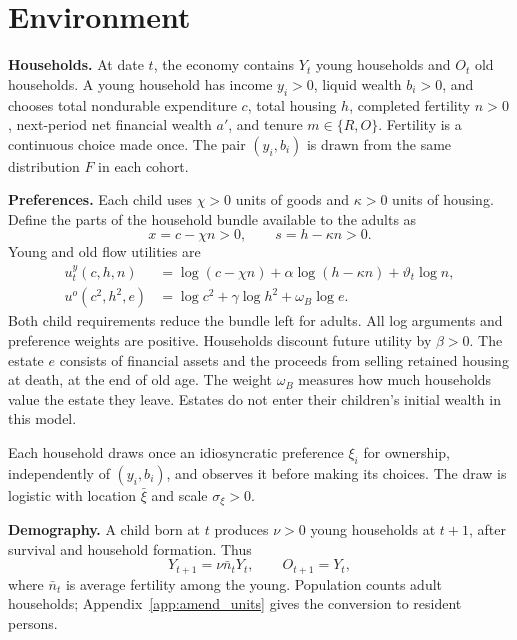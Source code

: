 \section{Environment}

\textbf{Households.}
At date $t$, the economy contains $Y_t$ young households and $O_t$ old
households. A young household has income $y_i>0$, liquid wealth $b_i>0$, and
chooses total nondurable expenditure $c$, total housing $h$, completed
fertility $n>0$, next-period net financial wealth $a'$, and tenure $m\in\{R,O\}$. Fertility is a
continuous choice made once. The pair $(y_i,b_i)$ is drawn from the same
distribution $F$ in each cohort.

\textbf{Preferences.}
Each child uses $\chi>0$ units of goods and $\kappa>0$ units of housing. Define
the parts of the household bundle available to the adults as
\begin{equation}
 x=c-\chi n>0,\qquad s=h-\kappa n>0.
 \label{eq:amend_usable_bundles}
\end{equation}
Young and old flow utilities are
\begin{align}
 u_t^y(c,h,n)&=\log(c-\chi n)+\alpha\log(h-\kappa n)
 +\vartheta_t\log n,
 \label{eq:amend_preferences}\\
 u^o(c^2,h^2,e)&=\log c^2+\gamma\log h^2+\omega_B\log e.
 \label{eq:amend_old_preferences}
\end{align}
Both child requirements reduce the bundle left for adults. All log arguments
and preference weights are positive. Households discount future utility by $\beta>0$.
The estate $e$ consists of financial assets and the proceeds from selling
retained housing at death, at the end of old age. The weight $\omega_B$
measures how much households value the estate they leave. Estates do not
enter their children's initial wealth in this model.

Each household draws once an idiosyncratic preference $\xi_i$ for ownership,
independently of $(y_i,b_i)$, and observes it before making its choices.
The draw is logistic with location $\bar\xi$ and scale $\sigma_\xi>0$.

\textbf{Demography.}
A child born at $t$ produces $\nu>0$ young households at $t+1$, after survival
and household formation. Thus
\begin{equation}
 Y_{t+1}=\nu\bar n_tY_t,\qquad O_{t+1}=Y_t,
 \label{eq:amend_demography}
\end{equation}
where $\bar n_t$ is average fertility among the young. Population counts adult households; Appendix~\ref{app:amend_units} gives
the conversion to resident persons.

